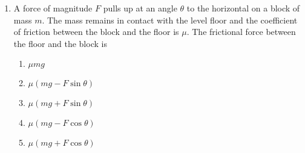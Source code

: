 \documentclass{../../oss-apphys}
\begin{document}
\begin{multicols}{2}
\begin{enumerate}[resume,leftmargin=18pt]
  \item A force of magnitude $F$ pulls up at an angle $\theta$ to the
    horizontal on a block of mass $m$. The mass remains in contact with the
    level floor and the coefficient of friction between the block and the floor
    is $\mu$. The frictional force between the floor and the block is
    \begin{center}
    \end{center}
    \begin{enumerate}[noitemsep,topsep=0pt,leftmargin=18pt,label=(\Alph*)]
    \item$\mu mg$
    \item$\mu (mg-F\sin\theta)$
    \item$\mu (mg+F\sin\theta)$
    \item$\mu (mg-F\cos\theta)$
    \item$\mu (mg+F\cos\theta)$
    \end{enumerate}

    
    

\end{enumerate}
\end{multicols}
\end{document}
